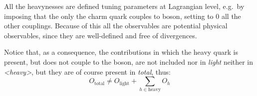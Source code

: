 All the heavynesses are defined tuning parameters at Lagrangian level, e.g.\ by
imposing that the only the charm quark couples to \ew boson, setting to 0 all
the other couplings.
Because of this all the observables are potential physical observables, since
they are well-defined and free of divergences.

Notice that, as a consequence, the contributions in which the heavy quark is
present, but does not couple to the \ew boson, are not included nor in
\textit{light} neither in \textit{<heavy>}, but they are of course present in
\textit{total}, thus:
\begin{equation}
  O_{\text{total}} \neq O_{\text{light}} + \sum_{h \in \text{heavy}} O_h 
\end{equation}
